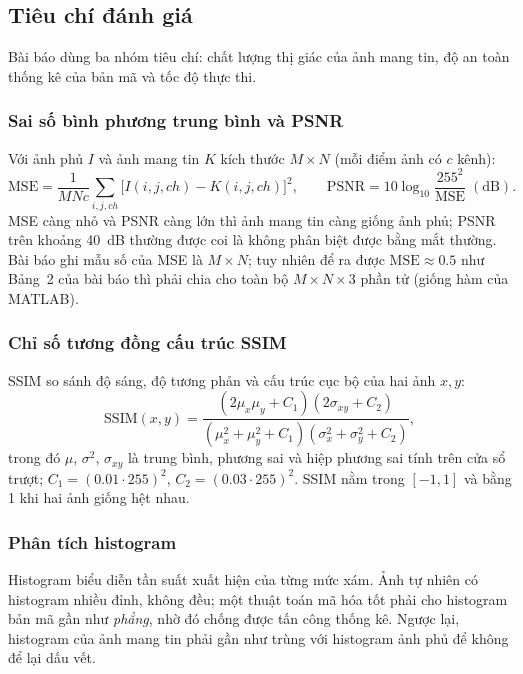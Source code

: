 \subsection{Tiêu chí đánh giá}
\label{sec:tieuchi}

Bài báo dùng ba nhóm tiêu chí: chất lượng thị giác của ảnh mang tin, độ an toàn thống kê của bản
mã và tốc độ thực thi.

\subsubsection{Sai số bình phương trung bình và PSNR}

Với ảnh phủ $I$ và ảnh mang tin $K$ kích thước $M \times N$ (mỗi điểm ảnh có $c$ kênh):
\begin{equation}
  \mathrm{MSE} = \frac{1}{MNc}\sum_{i,j,ch}\bigl[I(i,j,ch) - K(i,j,ch)\bigr]^2, \qquad
  \mathrm{PSNR} = 10\log_{10}\frac{255^2}{\mathrm{MSE}} \;(\mathrm{dB}).
  \label{eq:mse-psnr}
\end{equation}
MSE càng nhỏ và PSNR càng lớn thì ảnh mang tin càng giống ảnh phủ; PSNR trên khoảng
\SI{40}{dB} thường được coi là không phân biệt được bằng mắt thường. Bài báo ghi mẫu số của MSE
là $M \times N$; tuy nhiên để ra được $\mathrm{MSE} \approx 0.5$ như Bảng~2 của bài báo thì phải
chia cho toàn bộ $M \times N \times 3$ phần tử (giống hàm  của MATLAB).

\subsubsection{Chỉ số tương đồng cấu trúc SSIM}

SSIM \cite{wang2004ssim} so sánh độ sáng, độ tương phản và cấu trúc cục bộ của hai ảnh $x, y$:
\begin{equation}
  \mathrm{SSIM}(x,y) = \frac{(2\mu_x\mu_y + C_1)(2\sigma_{xy} + C_2)}
                            {(\mu_x^2 + \mu_y^2 + C_1)(\sigma_x^2 + \sigma_y^2 + C_2)},
  \label{eq:ssim}
\end{equation}
trong đó $\mu$, $\sigma^2$, $\sigma_{xy}$ là trung bình, phương sai và hiệp phương sai tính trên cửa
sổ trượt; $C_1 = (0.01\cdot255)^2$, $C_2 = (0.03\cdot255)^2$. SSIM nằm trong $[-1, 1]$ và bằng 1
khi hai ảnh giống hệt nhau.

\subsubsection{Phân tích histogram}

Histogram biểu diễn tần suất xuất hiện của từng mức xám. Ảnh tự nhiên có histogram nhiều đỉnh,
không đều; một thuật toán mã hóa tốt phải cho histogram bản mã gần như \emph{phẳng}, nhờ đó chống
được tấn công thống kê. Ngược lại, histogram của ảnh mang tin phải gần như trùng với histogram ảnh
phủ để không để lại dấu vết.


